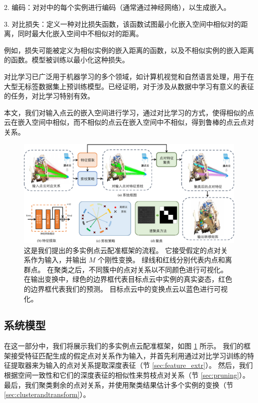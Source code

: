 2. 编码：对对中的每个实例进行编码（通常通过神经网络），以生成嵌入。

3. 对比损失：定义一种对比损失函数，该函数试图最小化嵌入空间中相似对的距离，同时最大化嵌入空间中不相似对的距离。

例如，损失可能被定义为相似实例的嵌入距离的函数，以及不相似实例的嵌入距离的函数。模型被训练以最小化这种损失。

对比学习已广泛用于机器学习的多个领域，如计算机视觉和自然语言处理，用于在大型无标签数据集上预训练模型。已经证明，对于涉及从数据中学习有意义的表征的任务，对比学习特别有效\cite{tian2020makes}。

本文，我们对输入点云的嵌入空间进行学习，通过对比学习的方式，使得相似的点云在嵌入空间中相似，而不相似的点云在嵌入空间中不相似，得到鲁棒的点云点对关系。

\begin{figure}[ht]
    \centering
    \includegraphics[width=1.0\textwidth]{images/pointcorr.pdf}
    \caption{
        这是我们提出的多实例点云配准框架的流程。
        它接受假定的点对关系作为输入，并输出 $M$ 个刚性变换。
        绿线和红线分别代表内点和离群点。
        在聚类之后，不同簇中的点对关系以不同颜色进行可视化。
        在输出变换中，绿色的边界框代表目标点云中实例的真实姿态，红色的边界框代表我们的预测。
        目标点云中的变换点云以蓝色进行可视化。      
    }
    \label{fig:point-pipeline}
  \end{figure}

\subsection{系统模型}
在这一部分中，我们将展示我们的多实例点云配准框架，如图 \ref{fig:point-pipeline} 所示。
我们的框架接受特征匹配生成的假定点对关系作为输入，并首先利用通过对比学习训练的特征提取器来为输入的点对关系提取深度表征（节 \ref{sec:feature_extr}）。
然后，我们根据空间一致性和它们的深度表征的相似性来剪枝点对关系（节 \ref{sec:pruning}）。
最后，我们聚类剩余的点对关系，并使用聚类结果估计多个实例的变换（节 \ref{sec:clusterandtransform}）。

